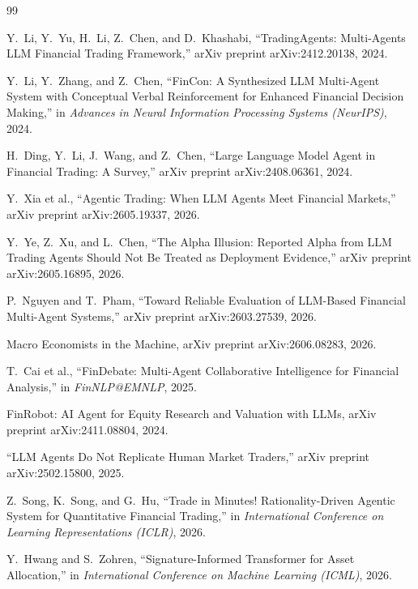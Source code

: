 \documentclass[twocolumn]{article}
\begin{document}
\begin{thebibliography}{99}

Y.~Li, Y.~Yu, H.~Li, Z.~Chen, and D.~Khashabi,
``TradingAgents: Multi-Agents LLM Financial Trading Framework,''
arXiv preprint arXiv:2412.20138, 2024.

Y.~Li, Y.~Zhang, and Z.~Chen,
``FinCon: A Synthesized LLM Multi-Agent System with Conceptual Verbal Reinforcement for Enhanced Financial Decision Making,''
in \textit{Advances in Neural Information Processing Systems (NeurIPS)}, 2024.

H.~Ding, Y.~Li, J.~Wang, and Z.~Chen,
``Large Language Model Agent in Financial Trading: A Survey,''
arXiv preprint arXiv:2408.06361, 2024.

Y.~Xia et al.,
``Agentic Trading: When LLM Agents Meet Financial Markets,''
arXiv preprint arXiv:2605.19337, 2026.

Y.~Ye, Z.~Xu, and L.~Chen,
``The Alpha Illusion: Reported Alpha from LLM Trading Agents Should Not Be Treated as Deployment Evidence,''
arXiv preprint arXiv:2605.16895, 2026.

P.~Nguyen and T.~Pham,
``Toward Reliable Evaluation of LLM-Based Financial Multi-Agent Systems,''
arXiv preprint arXiv:2603.27539, 2026.

Macro Economists in the Machine,
arXiv preprint arXiv:2606.08283, 2026.

T.~Cai et al.,
``FinDebate: Multi-Agent Collaborative Intelligence for Financial Analysis,''
in \textit{FinNLP@EMNLP}, 2025.

FinRobot: AI Agent for Equity Research and Valuation with LLMs,
arXiv preprint arXiv:2411.08804, 2024.

``LLM Agents Do Not Replicate Human Market Traders,''
arXiv preprint arXiv:2502.15800, 2025.

Z.~Song, K.~Song, and G.~Hu,
``Trade in Minutes! Rationality-Driven Agentic System for Quantitative Financial Trading,''
in \textit{International Conference on Learning Representations (ICLR)}, 2026.

Y.~Hwang and S.~Zohren,
``Signature-Informed Transformer for Asset Allocation,''
in \textit{International Conference on Machine Learning (ICML)}, 2026.


\end{thebibliography}
\end{document}
